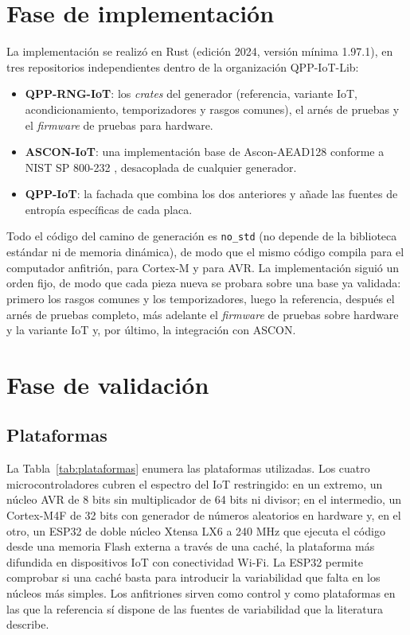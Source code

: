 \section{Fase de implementación}

La implementación se realizó en Rust (edición 2024, versión mínima 1.97.1), en tres repositorios independientes dentro de la organización QPP-IoT-Lib:

\begin{itemize}
    \item \textbf{QPP-RNG-IoT}: los \textit{crates} del generador (referencia, variante IoT, acondicionamiento, temporizadores y rasgos comunes), el arnés de pruebas y el \textit{firmware} de pruebas para hardware.
    \item \textbf{ASCON-IoT}: una implementación base de Ascon-AEAD128 conforme a NIST SP 800-232 \cite{Turan2025Ascon-BasedFunctions}, desacoplada de cualquier generador.
    \item \textbf{QPP-IoT}: la fachada que combina los dos anteriores y añade las fuentes de entropía específicas de cada placa.
\end{itemize}

Todo el código del camino de generación es \texttt{no\_std} (no depende de la biblioteca estándar ni de memoria dinámica), de modo que el mismo código compila para el computador anfitrión, para Cortex-M y para AVR. La implementación siguió un orden fijo, de modo que cada pieza nueva se probara sobre una base ya validada: primero los rasgos comunes y los temporizadores, luego la referencia, después el arnés de pruebas completo, más adelante el \textit{firmware} de pruebas sobre hardware y la variante IoT y, por último, la integración con ASCON.

\section{Fase de validación}

\subsection{Plataformas}

La Tabla~\ref{tab:plataformas} enumera las plataformas utilizadas. Los cuatro microcontroladores cubren el espectro del IoT restringido: en un extremo, un núcleo AVR de 8 bits sin multiplicador de 64 bits ni divisor; en el intermedio, un Cortex-M4F de 32 bits con generador de números aleatorios en hardware y, en el otro, un ESP32 de doble núcleo Xtensa LX6 a 240 MHz que ejecuta el código desde una memoria Flash externa a través de una caché, la plataforma más difundida en dispositivos IoT con conectividad Wi-Fi. La ESP32 permite comprobar si una caché basta para introducir la variabilidad que falta en los núcleos más simples. Los anfitriones sirven como control y como plataformas en las que la referencia sí dispone de las fuentes de variabilidad que la literatura describe.

